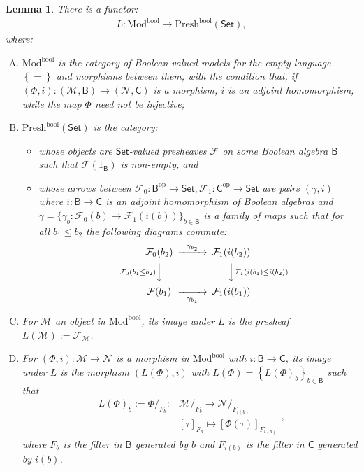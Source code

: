 \documentclass[11pt]{amsart}
\newcommand{\Mod}{\textrm{Mod}}
\newcommand{\F}{\mathcal{F}}
\newcommand{\Presh}{\textrm{Presh}}
\newcommand{\modx}{\Mod^{\textrm{bool}}}
\theoremstyle{plain}
\newtheorem{lemma}[theorem]{Lemma}
\theoremstyle{definition}
\theoremstyle{plain}
\theoremstyle{remark}
\newcommand{\N}{\mathcal{N}}
\newcommand{\M}{\mathcal{M}}
\newcommand{\dSet}{\mathsf{Set}}
\newcommand{\bool}[1]{\mathsf{#1}}
\newcommand{\bp}[1]{\left\lbrace #1 \right\rbrace}
\newcommand{\0}{\mathsf{0}}
\renewcommand{\1}{\mathsf{1}}
\renewcommand{\2}{\mathsf{2}}
\theoremstyle{definition}
\begin{document}
\begin{lemma}

There is a functor:
\begin{align*}
L:\modx\to\Presh^{\textrm{bool}}(\dSet),
\end{align*}
where:
\begin{enumerate}[(A)]
\item $\modx$ is the category of Boolean valued models for the empty language $\bp{=}$ and morphisms between them, with the condition that, if $(\Phi, i):(\M, \bool{B})\to(\N, \bool{C})$ is a morphism, $i$ is an adjoint homomorphism, while the map $\Phi$ need not be injective;
\item\label{item:defmorphpreshboolvalmod}
 $\Presh^{\textrm{bool}}(\dSet)$ is the category:
\begin{itemize}
\item
whose objects are $\dSet$-valued presheaves $\F$ on some Boolean algebra $\bool{B}$ such that $\F(1_\bool{B})$ is non-empty, and 
\item
whose arrows between $\F_0:\bool{B}^{\textrm{op}}\to\dSet, \F_1:\bool{C}^{\textrm{op}}\to\dSet$ are pairs $(\gamma, i)$ where $i:\bool{B}\to\bool{C}$ is an adjoint homomorphism of Boolean algebras and $\gamma=\{\gamma_b:\F_0(b)\to\F_1(i(b))\}_{b\in\bool{B}}$ is a family of maps such that for all $b_1\leq b_2$ the following diagrams commute:
\begin{equation}\label{eqn:diagmorphboolpresh}
\begin{CD}
\F_0(b_2) @>\gamma_{b_2}>>  \F_1(i(b_2))\\
@V{\F_0(b_1\leq b_2)}VV              @VV{\F_1(i(b_1)\leq i(b_2))}V\\
\F(b_1)@>>\gamma_{b_1}>  \F_1(i(b_1))\\
\end{CD}
\end{equation}
\end{itemize}
\item For $\M$ an object in $\modx$, its image under $L$ is the presheaf $L(\M):=\F_\M$.
\item For $(\Phi, i):\M\to \N$ is a morphism in $\modx$ with $i:\bool{B}\to\bool{C}$, its image under $L$ is the morphism $(L(\Phi), i)$ with
$L(\Phi)=\bp{L(\Phi)_b}_{b\in\bool{B}}$ such that 
\[
\begin{aligned}
L(\Phi)_b:=\Phi/_{F_b}:&\M/_{F_b}\to\N/_{F_{i(b)}}\\
&[\tau]_{F_b}\mapsto[\Phi(\tau)]_{F_{i(b)}}
\end{aligned},
\]
where $F_b$ is the filter in $\bool{B}$ generated by $b$ and $F_{i(b)}$ is the filter in $\bool{C}$ generated by $i(b)$.
\end{enumerate}
\end{lemma}
\end{document}
